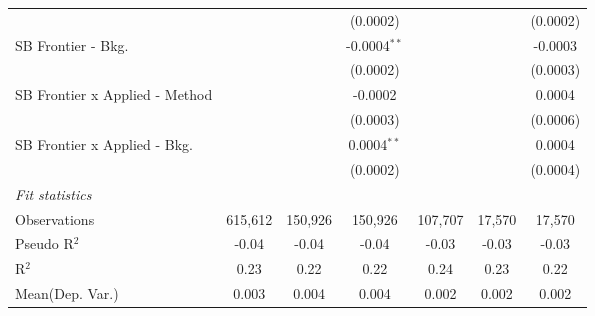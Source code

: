 \begin{tabular}{lcccccc}
                                  &                 &                 & (0.0002)        &                 &                & (0.0002)\\   
   SB Frontier - Bkg.             &                 &                 & -0.0004$^{**}$  &                 &                & -0.0003\\   
                                  &                 &                 & (0.0002)        &                 &                & (0.0003)\\   
   SB Frontier x Applied - Method &                 &                 & -0.0002         &                 &                & 0.0004\\   
                                  &                 &                 & (0.0003)        &                 &                & (0.0006)\\   
   SB Frontier x Applied - Bkg.   &                 &                 & 0.0004$^{**}$   &                 &                & 0.0004\\   
                                  &                 &                 & (0.0002)        &                 &                & (0.0004)\\   
   \midrule
   \emph{Fit statistics}\\
   Observations                   & 615,612         & 150,926         & 150,926         & 107,707         & 17,570         & 17,570\\  
   Pseudo R$^2$                   & -0.04           & -0.04           & -0.04           & -0.03           & -0.03          & -0.03\\  
   R$^2$                          & 0.23            & 0.22            & 0.22            & 0.24            & 0.23           & 0.22\\  
Mean(Dep. Var.) & 0.003 & 0.004 & 0.004 & 0.002 & 0.002 & 0.002 \\
   

\end{tabular}
